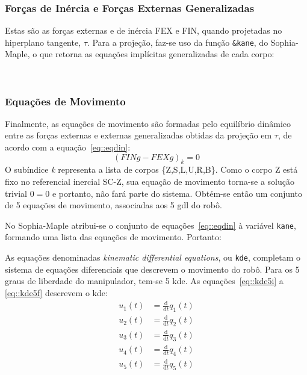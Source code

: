 		 
\subsubsection{Forças de Inércia e  Forças Externas Generalizadas}

Estas são as forças externas e de inércia FEX e FIN, quando projetadas no
hiperplano tangente, $\tau$. Para a projeção, faz-se uso da função
\texttt{\&kane}, do Sophia-Maple, o que retorna as equações implícitas
generalizadas de cada corpo:

\bigskip {} \\
		 
\subsubsection{Equações de Movimento}

Finalmente, as equações de movimento são formadas pelo equilíbrio dinâmico entre
as forças externas e externas generalizadas obtidas da projeção em $\tau$, de
acordo com a equação~\ref{eq::eqdin}:
%
\begin{equation}
	(FINg - FEXg)_{k} = 0 \label{eq::eqdin}
\end{equation}
%
O subíndice \textit{k} representa a lista de corpos \{Z,S,L,U,R,B\}. Como o
corpo Z está fixo no referencial inercial SC-Z, sua equação de movimento
torna-se a solução trivial $0=0$ e portanto, não fará parte do sistema. Obtém-se
então um conjunto de 5 equações de movimento, associadas aos 5 gdl do robô.

No Sophia-Maple atribui-se o conjunto de equações~\ref{eq::eqdin} à
variável \texttt{kane}, formando uma lista das equações de movimento. Portanto:

\bigskip {} \bigskip

As equações denominadas \textit{kinematic differential equations}, ou
\texttt{kde}, completam o sistema de equações diferenciais que descrevem o
movimento do robô.
Para os 5 graus de liberdade do manipulador, tem-se 5 kde. As
equações~\ref{eq::kde5i} a \ref{eq::kde5f} descrevem o kde:
%
\begin{align}
	u_{1}(t) &= \frac{\mathrm{d} }{\mathrm{d} t}q_{1}(t) \label{eq::kde5i} \\
	u_{2}(t) &= \frac{\mathrm{d} }{\mathrm{d} t}q_{2}(t) \\
	u_{3}(t) &= \frac{\mathrm{d} }{\mathrm{d} t}q_{3}(t) \\
	u_{4}(t) &= \frac{\mathrm{d} }{\mathrm{d} t}q_{4}(t) \\
	u_{5}(t) &= \frac{\mathrm{d} }{\mathrm{d} t}q_{5}(t) \label{eq::kde5f}	
\end{align}
%

